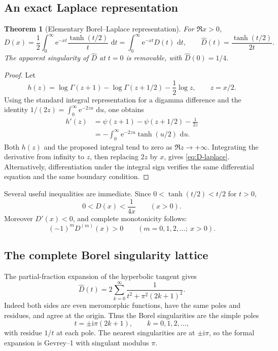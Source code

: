 \documentclass[11pt,a4paper]{article}
\numberwithin{equation}{section}
\newtheorem{theorem}{Theorem}[section]
\theoremstyle{definition}
\theoremstyle{remark}
\newcommand{\e}{\mathrm e}
\newcommand{\dd}{\,\mathrm d}
\newcommand{\ii}{\mathrm i}
\begin{document}
\subsection{An exact Laplace representation}

\begin{theorem}[Elementary Borel--Laplace representation]\label{thm:laplace-D}
For \(\Re x>0\),
\begin{equation}\label{eq:D-laplace}
 D(x)=\frac12\int_0^\infty
       \e^{-xt}\frac{\tanh(t/2)}{t}\,\dd t
 =\int_0^\infty \e^{-xt}\widehat D(t)\,\dd t,
 \qquad
 \widehat D(t)=\frac{\tanh(t/2)}{2t}.
\end{equation}
The apparent singularity of \(\widehat D\) at \(t=0\) is removable, with
\(\widehat D(0)=1/4\).
\end{theorem}

\begin{proof}
Let
\[
 h(z)=\log\Gamma(z+1)-\log\Gamma(z+1/2)-\frac12\log z,
 \qquad z=x/2.
\]
Using the standard integral representation for a digamma difference and the
identity \(1/(2z)=\int_0^\infty \e^{-2zu}\,\dd u\), one obtains
\begin{align*}
 h'(z)
 &=\psi(z+1)-\psi(z+1/2)-\frac1{2z}\\
 &=-\int_0^\infty \e^{-2zu}\tanh(u/2)\,\dd u.
\end{align*}
Both \(h(z)\) and the proposed integral tend to zero as
\(\Re z\to+\infty\).  Integrating the derivative from infinity to \(z\),
then replacing \(2z\) by \(x\), gives \cref{eq:D-laplace}.
Alternatively, differentiation under the integral sign verifies the same
differential equation and the same boundary condition.
\end{proof}

Several useful inequalities are immediate.  Since
\(0<\tanh(t/2)<t/2\) for \(t>0\),
\begin{equation}\label{eq:D-simple-bound}
 0<D(x)<\frac1{4x}\qquad(x>0).
\end{equation}
Moreover \(D'(x)<0\), and complete monotonicity follows:
\begin{equation}\label{eq:D-complete-monotone}
 (-1)^mD^{(m)}(x)>0\qquad(m=0,1,2,\ldots;\ x>0).
\end{equation}

\subsection{The complete Borel singularity lattice}

The partial-fraction expansion of the hyperbolic tangent gives
\begin{equation}\label{eq:Borel-partial-fraction}
 \widehat D(t)
 =2\sum_{k=0}^\infty
   \frac1{t^2+\pi^2(2k+1)^2}.
\end{equation}
Indeed both sides are even meromorphic functions, have the same poles and
residues, and agree at the origin.  Thus the Borel singularities are the
simple poles
\begin{equation}\label{eq:Borel-poles}
 t=\pm\ii\pi(2k+1),\qquad k=0,1,2,\ldots,
\end{equation}
with residue \(1/t\) at each pole.  The nearest singularities are at
\(\pm\ii\pi\), so the formal expansion is Gevrey--1 with singulant modulus
\(\pi\).
\end{document}
